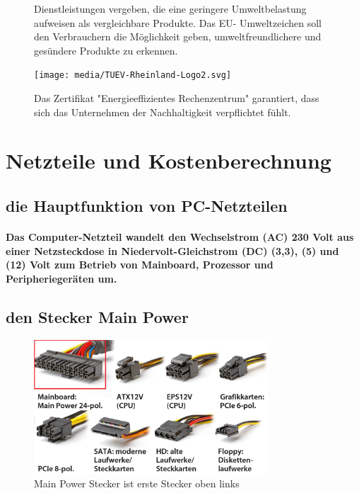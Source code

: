 \documentclass[a4paper]{article}
\begin{document}
\begin{multicols}{2}
\begin{figure}[H]
{                Dienstleistungen vergeben, die eine
                geringere Umweltbelastung aufweisen als
                vergleichbare Produkte. Das EU-
                Umweltzeichen soll den Verbrauchern die
                Möglichkeit geben, umweltfreundlichere und
                gesündere Produkte zu erkennen.}
                \label{fig:ECOLABEL}
            \end{figure}
            \begin{figure}[H]
                \centering
                \texttt{[image: media/TUEV-Rheinland-Logo2.svg]}
                \captionsetup{labelformat=empty}
                \caption{\color{orange}Das Zertifikat "Energieeffizientes
                Rechenzentrum" garantiert, dass sich das
                Unternehmen der Nachhaltigkeit verpflichtet
                fühlt.}
                \label{fig:TUEV}
            \end{figure}
        \end{multicols}
    
    \section{Netzteile und Kostenberechnung}\label{sec:netzteile-und-kostenberechnung}
        \subsection{\color{red}die Hauptfunktion von PC-Netzteilen}\label{subsec:die-hauptfunktion-von-pc-netzteilen}
        \paragraph{\color{codegreen} Das Computer-Netzteil wandelt den Wechselstrom (AC) 230 Volt aus einer Netzsteckdose in Niedervolt-Gleichstrom (DC) (3,3), (5) und (12) Volt zum Betrieb von Mainboard, Prozessor und Peripheriegeräten um.}
    \subsection{\color{red}den Stecker Main Power}\label{subsec:den-stecker-main-power}
        \begin{center}
            \begin{figure}[H]
                \centering
                \includegraphics[height=5cm]{media/netzteile}
                \captionsetup{labelformat=empty}
                \caption{\color{orange} Main Power Stecker ist erste Stecker oben links }
                \label{fig:netzteile}
            \end{figure}
        \end{center}
\end{document}
